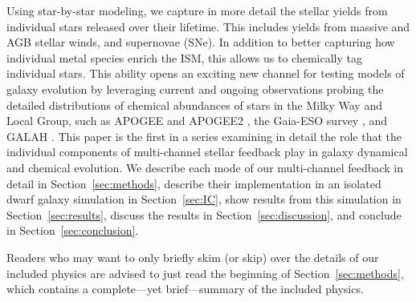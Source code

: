 \documentclass[twocolumn]{aastex61}
\begin{document}
Using star-by-star modeling, we capture in more detail the stellar yields from individual stars released over their lifetime. This includes yields from massive and AGB stellar winds, and supernovae (SNe). In addition to better capturing how individual metal species enrich the ISM, this allows us to chemically tag individual stars. This ability opens an exciting new channel for testing models of galaxy evolution by leveraging current and ongoing observations probing the detailed distributions of chemical abundances of stars in the Milky Way and Local Group, such as APOGEE and APOGEE2 \citep{APOGEE2010,APOGEE}, the Gaia-ESO survey \citep{Gaia}, and GALAH \citep{GALAH}. This paper is the first in a series examining in detail the role that the individual components of multi-channel stellar feedback play in galaxy dynamical and chemical evolution. We describe each mode of our multi-channel feedback 
in detail in Section~\ref{sec:methods}, describe their implementation in an isolated dwarf galaxy simulation in Section~\ref{sec:IC}, show results from this simulation in Section~\ref{sec:results}, discuss the results in Section~\ref{sec:discussion}, and conclude in Section~\ref{sec:conclusion}.

Readers who may want to only briefly skim (or skip) over the details of our included physics are advised to just read the beginning of Section~\ref{sec:methods}, which contains a complete---yet brief---summary of the included physics.
\end{document}
